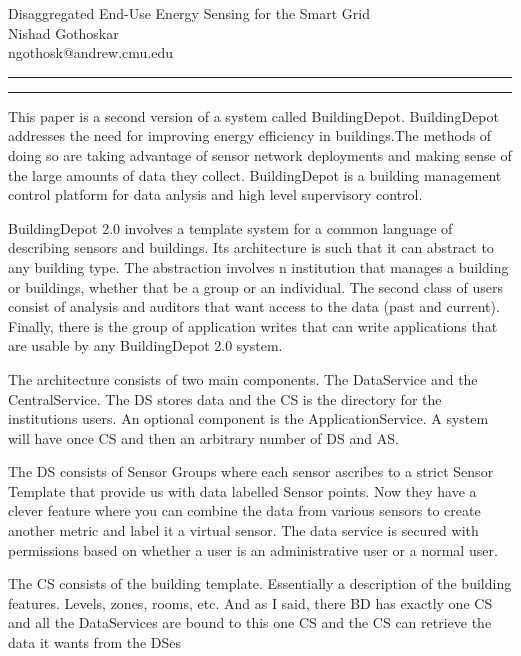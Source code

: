 \documentclass[11pt]{article}
\newcommand{\question}[2] {\vspace{.25in} \hrule\vspace{0.5em}
	\noindent{\bf #1: #2} \vspace{0.5em}
	\hrule \vspace{.10in}}
\newcommand{\myname}{Nishad Gothoskar}
\newcommand{\myandrew}{ngothosk}
\begin{document}
	
	\medskip                        %
	
	\thispagestyle{plain}
	\begin{center}                  %
		{\Large Disaggregated
End-Use Energy Sensing for the Smart Grid
} \\
		\myname \\
		\myandrew @andrew.cmu.edu\\
	\end{center}
	
	\question{1}{Summary}
	\quad This paper is a second version of a system called BuildingDepot. BuildingDepot addresses the need for improving energy efficiency in buildings.The methods of doing so are taking advantage of sensor network deployments and making sense of the large amounts of data they collect. BuildingDepot is a building management control platform for data anlysis and high level supervisory control.
	
	\quad BuildingDepot 2.0 involves a template system for a common language of describing sensors and buildings. Its architecture is such that it can abstract to any building type. The abstraction involves n institution that manages a building or buildings, whether that be a group or an individual. The second class of users consist of analysis and auditors that want access to the data (past and current). Finally, there is the group of application writes that can write applications that are usable by any BuildingDepot 2.0 system.
	
	\quad The architecture consists of two main components. The DataService and the CentralService. The DS stores data and the CS is the directory for the institutions users. An optional component is the ApplicationService. A system will have once CS and then an arbitrary number of DS and AS.
	
	\quad The DS consists of Sensor Groups where each sensor ascribes to a strict Sensor Template that provide us with data labelled Sensor points. Now they have a clever feature where you can combine the data from various sensors to create another metric and label it a virtual sensor. The data service is secured with permissions based on whether a user is an administrative user or a normal user.
	
	\quad The CS consists of the building template. Essentially a description of the building features. Levels, zones, rooms, etc. And as I said, there BD has exactly one CS and all the DataServices are bound to this one CS and the CS can retrieve the data it wants from the DSes
	
\end{document}
